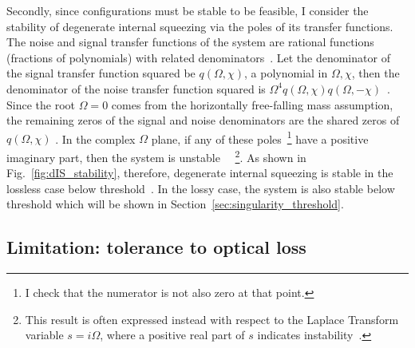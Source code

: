 Secondly, since configurations must be stable to be feasible, I consider the stability of degenerate internal squeezing via the poles of its transfer functions. 
The noise and signal transfer functions of the system are rational functions (fractions of polynomials) with related denominators~\cite{korobkoQuantumExpanderGravitationalwave2019}. Let the denominator of the signal transfer function squared be $q(\Omega,\chi)$, a polynomial in $\Omega,\chi$, then the denominator of the noise transfer function squared is $\Omega^4 q(\Omega,\chi) q(\Omega,-\chi)$~\cite{korobkoQuantumExpanderGravitationalwave2019}. Since the root $\Omega=0$ comes from the horizontally free-falling mass assumption, the remaining zeros of the signal and noise denominators are the shared zeros of $q(\Omega,\chi)$ . In the complex $\Omega$ plane, if any of these poles~\footnote{I check that the numerator is not also zero at that point.} have a positive imaginary part, then the system is unstable ~\cite{}~\footnote{This result is often expressed instead with respect to the Laplace Transform variable $s=i\Omega$, where a positive real part of $s$ indicates instability~\cite{}.}. %
As shown in Fig.~\ref{fig:dIS_stability}, therefore, degenerate internal squeezing is stable in the lossless case below threshold~\cite{}. In the lossy case, the system is also stable below threshold which will be shown in Section~\ref{sec:singularity_threshold}.


\subsection{Limitation: tolerance to optical loss}
\label{sec:dIS_optical_loss}

